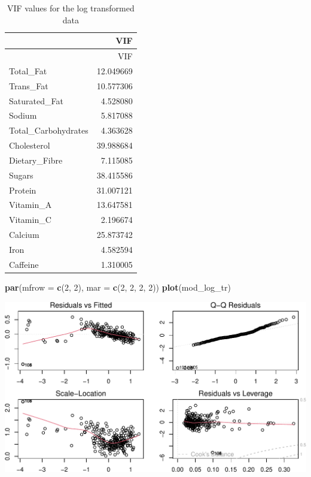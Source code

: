 \documentclass[
]{article}
\newenvironment{Shaded}{\begin{snugshade}}{\end{snugshade}}
\newcommand{\AttributeTok}[1]{\textcolor[rgb]{0.13,0.29,0.53}{#1}}
\newcommand{\DecValTok}[1]{\textcolor[rgb]{0.00,0.00,0.81}{#1}}
\newcommand{\FunctionTok}[1]{\textcolor[rgb]{0.13,0.29,0.53}{\textbf{#1}}}
\newcommand{\NormalTok}[1]{#1}
\begin{document}
\begin{longtable}[]{@{}lr@{}}
\caption{VIF values for the log transformed data}\tabularnewline
\toprule\noalign{}
& VIF \\
\midrule\noalign{}
\endfirsthead
\toprule\noalign{}
& VIF \\
\midrule\noalign{}
\endhead
\bottomrule\noalign{}
\endlastfoot
Total\_Fat & 12.049669 \\
Trans\_Fat & 10.577306 \\
Saturated\_Fat & 4.528080 \\
Sodium & 5.817088 \\
Total\_Carbohydrates & 4.363628 \\
Cholesterol & 39.988684 \\
Dietary\_Fibre & 7.115085 \\
Sugars & 38.415586 \\
Protein & 31.007121 \\
Vitamin\_A & 13.647581 \\
Vitamin\_C & 2.196674 \\
Calcium & 25.873742 \\
Iron & 4.582594 \\
Caffeine & 1.310005 \\
\end{longtable}

\begin{Shaded}
\begin{Highlighting}[]
\FunctionTok{par}\NormalTok{(}\AttributeTok{mfrow =} \FunctionTok{c}\NormalTok{(}\DecValTok{2}\NormalTok{, }\DecValTok{2}\NormalTok{), }\AttributeTok{mar =} \FunctionTok{c}\NormalTok{(}\DecValTok{2}\NormalTok{, }\DecValTok{2}\NormalTok{, }\DecValTok{2}\NormalTok{, }\DecValTok{2}\NormalTok{))}
\FunctionTok{plot}\NormalTok{(mod\_log\_tr)}
\end{Highlighting}
\end{Shaded}

\begin{center}\includegraphics{Statistical_Learning_Final_Report_files/figure-latex/standardization-1} \end{center}
\end{document}
